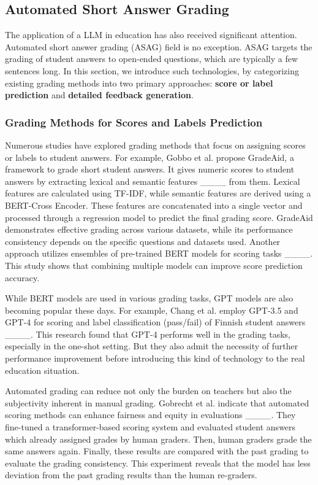 \subsection{Automated Short Answer Grading}
The application of a LLM in education has also received significant attention.
Automated short answer grading (ASAG) field is no exception.
ASAG targets the grading of student answers to open-ended questions, which are typically a few sentences long.
In this section, we introduce such technologies, by categorizing existing grading methods into two primary approaches: \textbf{score or label prediction} and \textbf{detailed feedback generation}.


\subsubsection{Grading Methods for Scores and Labels Prediction}
Numerous studies have explored grading methods that focus on assigning scores or labels to student answers.
For example, Gobbo et al. propose GradeAid, a framework to grade short student answers.
It gives numeric scores to student answers by extracting lexical and semantic features ____ from them.
Lexical features are calculated using TF-IDF, while semantic features are derived using a BERT-Cross Encoder.
These features are concatenated into a single vector and processed through a regression model to predict the final grading score.
GradeAid demonstrates effective grading across various datasets, while its performance consistency depends on the specific questions and datasets used.
% 
Another approach utilizes ensembles of pre-trained BERT models for scoring tasks ____.
This study shows that combining multiple models can improve score prediction accuracy.

While BERT models are used in various grading tasks, GPT models are also becoming popular these days.
For example, Chang et al. employ GPT-3.5 and GPT-4 for scoring and label classification (pass/fail) of Finnish student answers ____.
This research found that GPT-4 performs well in the grading tasks, especially in the one-shot setting.
But they also admit the necessity of further performance improvement before introducing this kind of technology to the real education situation.


Automated grading can reduce not only the burden on teachers but also the subjectivity inherent in manual grading.
Gobrecht et al. indicate that automated scoring methods can enhance fairness and equity in evaluations ____.
They fine-tuned a transformer-based scoring system and evaluated student answers which already assigned grades by human graders.
Then, human graders grade the same answers again.
Finally, these results are compared with the past grading to evaluate the grading consistency.
This experiment reveals that the model has less deviation from the past grading results than the human re-graders.


